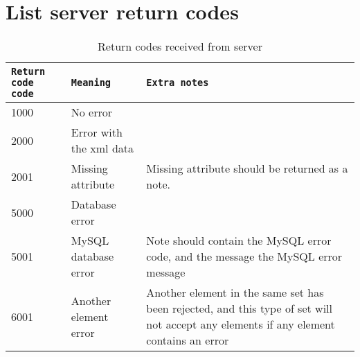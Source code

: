 \newpage
\section{List server return codes}

\begin{table}[h]
    \centering
    \caption{Return codes received from server}
    \begin{tabular}{|l|l|p{5cm}|}
        \hline
        \texttt{Return code code} & \texttt{Meaning} & \texttt{Extra notes} \\
        \hline
        \hline
        1000 & No error & \\
        \hline
        \hline
        2000 & Error with the \gls{xml} data & \\
        \hline
        2001 & Missing attribute & Missing attribute should be returned as a note. \\
        \hline
        \hline
        5000 & Database error & \\
        \hline
        5001 & MySQL database error & Note should contain the MySQL error code, 
        and the message the MySQL error message \\
        \hline
        \hline
        6001 & Another element error & Another element in the same set has been
        rejected, and this type of set will not accept any elements if any
        element contains an error\\
        \hline
    \end{tabular}
    \label{tbl:server_error_codes}
\end{table}
